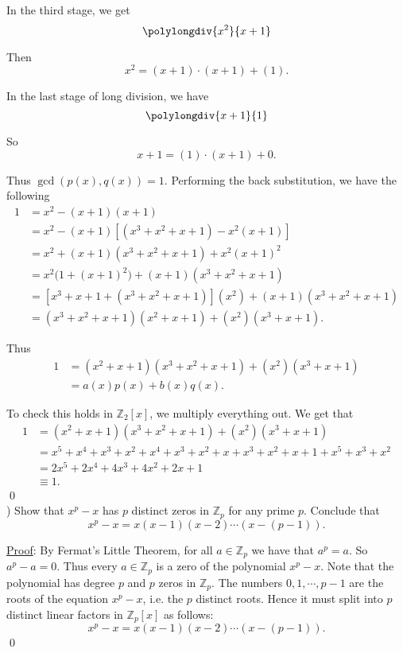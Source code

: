 \documentclass{article}
\begin{document}
In the third stage, we get
$$\polylongdiv{x^2}{x+1}$$

Then
\begin{equation}
	x^2 = (x+1) \cdot (x+1) + (1).
\end{equation}

In the last stage of long division, we have
$$\polylongdiv{x+1}{1}$$

So 
\begin{equation}
	x+1 = (1) \cdot (x+1) + 0.
\end{equation}

Thus $\gcd(p(x), q(x)) = 1$. Performing the back substitution, we have the following 
\begin{align*}
	1 &= x^2 - (x+1)(x+1) \\
	&= x^2 - (x+1) [(x^3+x^2+x+1) - x^2(x+1)] \\
	&= x^2 + (x+1)(x^3+x^2+x+1) + x^2(x+1)^2 \\
	&= x^2 \big(1+(x+1)^2 \big) + (x+1)(x^3+x^2+x+1) \\
	&= [x^3+x+1 + (x^3+x^2+x+1)](x^2) + (x+1)(x^3+x^2+x+1) \\
	&= (x^3+x^2+x+1)(x^2+x+1) + (x^2)(x^3+x+1).
\end{align*}

Thus
\begin{align*}
	1 &= (x^2+x+1)(x^3+x^2+x+1) + (x^2)(x^3+x+1) \\
	&= a(x)p(x) + b(x)q(x).
\end{align*}

To check this holds in $\mathbb{Z}_2[x]$, we multiply everything out. We get that
\begin{align*}
	1 &= (x^2+x+1)(x^3+x^2+x+1) + (x^2)(x^3+x+1) \\
	&= x^5 + x^4 + x^3 + x^2 + x^4 + x^3 + x^2 + x + x^3 + x^2 + x + 1 + x^5 + x^3 + x^2 \\
	&= 2x^5 + 2x^4 + 4x^3 + 4x^2 + 2x + 1 \\
	&\equiv 1.
\end{align*} 
\qed \\

) Show that $x^p - x$ has $p$ distinct zeros in $\mathbb{Z}_p$ for any prime $p$. Conclude that 
$$x^p - x = x(x-1)(x-2) \cdots (x-(p-1)).$$

\underline{Proof}: By Fermat's Little Theorem, for all $a \in \mathbb{Z}_p$ we have that $a^p = a$. So $a^p - a = 0$. Thus every $a \in \mathbb{Z}_p$ is a zero of the polynomial $x^p - x$. Note that the polynomial has degree $p$ and $p$ zeros in $\mathbb{Z}_p$. The numbers $0, 1, \cdots, p-1$ are the roots of the equation $x^p - x$, i.e. the $p$ distinct roots. Hence it must split into $p$ distinct linear factors in $\mathbb{Z}_p[x]$ as follows:
$$x^p - x = x(x-1)(x-2) \cdots (x-(p-1)).$$ \qed \\
\end{document}
